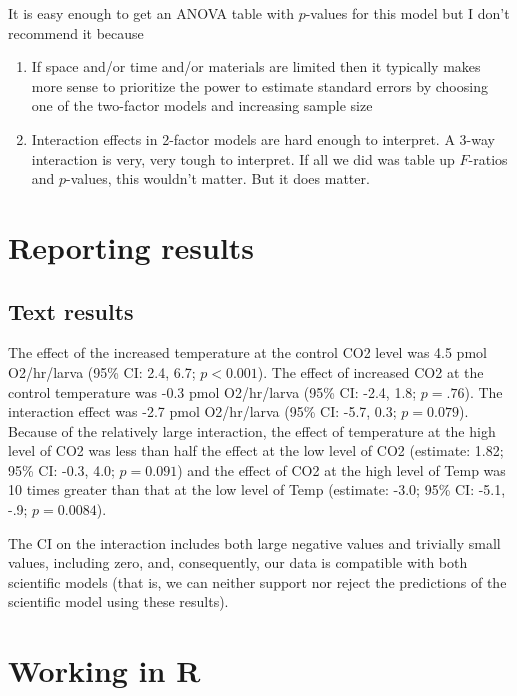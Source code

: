 \documentclass[]{book}
\providecommand{\tightlist}{%
  \setlength{\itemsep}{0pt}\setlength{\parskip}{0pt}}
\begin{document}
It is easy enough to get an ANOVA table with \(p\)-values for this model but I don't recommend it because

\begin{enumerate}
\def\labelenumi{\arabic{enumi}.}
\tightlist
\item
  If space and/or time and/or materials are limited then it typically makes more sense to prioritize the power to estimate standard errors by choosing one of the two-factor models and increasing sample size
\item
  Interaction effects in 2-factor models are hard enough to interpret. A 3-way interaction is very, very tough to interpret. If all we did was table up \(F\)-ratios and \(p\)-values, this wouldn't matter. But it does matter.
\end{enumerate}

\hypertarget{reporting-results}{%
\section{Reporting results}\label{reporting-results}}

\hypertarget{text-results}{%
\subsection{Text results}\label{text-results}}

The effect of the increased temperature at the control CO2 level was 4.5 pmol O2/hr/larva (95\% CI: 2.4, 6.7; \(p < 0.001\)). The effect of increased CO2 at the control temperature was -0.3 pmol O2/hr/larva (95\% CI: -2.4, 1.8; \(p=.76\)). The interaction effect was -2.7 pmol O2/hr/larva (95\% CI: -5.7, 0.3; \(p = 0.079\)). Because of the relatively large interaction, the effect of temperature at the high level of CO2 was less than half the effect at the low level of CO2 (estimate: 1.82; 95\% CI: -0.3, 4.0; \(p = 0.091\)) and the effect of CO2 at the high level of Temp was 10 times greater than that at the low level of Temp (estimate: -3.0; 95\% CI: -5.1, -.9; \(p = 0.0084\)).

The CI on the interaction includes both large negative values and trivially small values, including zero, and, consequently, our data is compatible with both scientific models (that is, we can neither support nor reject the predictions of the scientific model using these results).

\hypertarget{working-in-r-3}{%
\section{Working in R}\label{working-in-r-3}}
\end{document}
